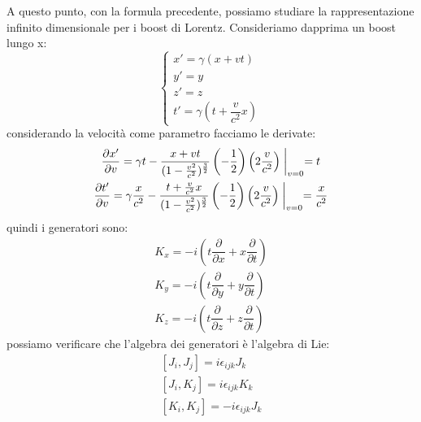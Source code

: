 A questo punto, con la formula precedente, possiamo studiare la rappresentazione infinito dimensionale per i boost di Lorentz. Consideriamo dapprima un boost lungo x:
\begin{equation}
    \begin{cases}
         x' = \gamma(x+vt)\\
         y'=y\\
         z'=z
         \\
      t'=\gamma(t+\dfrac{v}{c^2} x)
    \end{cases}\,
\end{equation}
considerando la velocità come parametro facciamo le derivate:
\begin{equation}
    \begin{gathered}
        \dfrac{\partial x'}{\partial v}=\gamma t-\dfrac{x+vt}{(1-\frac{v^2}{c^2})^\frac{3}{2}}\left(-\dfrac{1}{2}\right)\left(2\dfrac{v}{c^2}\right)\biggm|_{v=0 }=t\\
        \dfrac{\partial t'}{\partial v}=\gamma \dfrac{x}{c^2}-\dfrac{t+\frac{v}{c^2} x}{(1-\frac{v^2}{c^2})^\frac{3}{2}}\left(-\dfrac{1}{2}\right)\left(2\dfrac{v}{c^2}\right)\biggm|_{v=0 }=\dfrac{x}{c^2}
    \end{gathered}
\end{equation}
quindi i generatori sono:
\begin{equation}
    \begin{gathered}
        K_x=-i\left(t\dfrac{\partial }{\partial x}+x\dfrac{\partial }{\partial t}\right)\\
          K_y=-i\left(t\dfrac{\partial }{\partial y}+y\dfrac{\partial }{\partial t}\right)\\
            K_z=-i\left(t\dfrac{\partial }{\partial z}+z\dfrac{\partial }{\partial t}\right)
    \end{gathered}
\end{equation}
possiamo verificare che l'algebra dei generatori è l'algebra di Lie:
\begin{equation}
    \begin{gathered}
        \left[J_i,J_j\right]=i\epsilon_{ijk}J_k\\
        \left[J_i,K_j\right]=i\epsilon_{ijk}K_k\\
         \left[K_i,K_j\right]=-i\epsilon_{ijk}J_k
    \end{gathered}
\end{equation}

